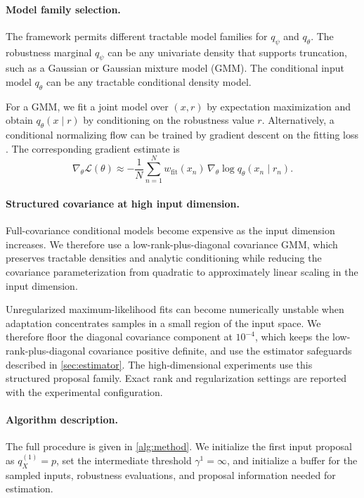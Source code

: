 \documentclass[twoside,11pt]{article}
\begin{document}
\paragraph{Model family selection.}
The framework permits different tractable model families for $q_{\psi}$ and $q_{\theta}$. The robustness marginal $q_{\psi}$ can be any univariate density that supports truncation, such as a Gaussian or Gaussian mixture model (GMM). The conditional input model $q_{\theta}$ can be any tractable conditional density model.

For a GMM, we fit a joint model over $(x,r)$ by expectation maximization and obtain $q_{\theta}(x\mid r)$ by conditioning on the robustness value $r$. Alternatively, a conditional normalizing flow can be trained by gradient descent on the fitting loss \citep{papamakarios2021normalizing}. The corresponding gradient estimate is
\begin{equation*}
    \nabla_{\theta}\mathcal{L}(\theta)
    \approx
    -\frac{1}{N}
    \sum_{n=1}^N
    w_{\mathrm{fit}}(x_n)\,
    \nabla_{\theta}
    \log q_{\theta}(x_n\mid r_n).
\end{equation*}

\paragraph{Structured covariance at high input dimension.}
Full-covariance conditional models become expensive as the input dimension increases. We therefore use a low-rank-plus-diagonal covariance GMM, which preserves tractable densities and analytic conditioning while reducing the covariance parameterization from quadratic to approximately linear scaling in the input dimension.

Unregularized maximum-likelihood fits can become numerically unstable when adaptation concentrates samples in a small region of the input space. We therefore floor the diagonal covariance component at $10^{-4}$, which keeps the low-rank-plus-diagonal covariance positive definite, and use the estimator safeguards described in \cref{sec:estimator}. The high-dimensional experiments use this structured proposal family. Exact rank and regularization settings are reported with the experimental configuration.

\paragraph{Algorithm description.}
The full procedure is given in \cref{alg:method}. We initialize the first input proposal as $q_X^{(1)}=p$, set the intermediate threshold $\gamma^1=\infty$, and initialize a buffer for the sampled inputs, robustness evaluations, and proposal information needed for estimation.
\end{document}
